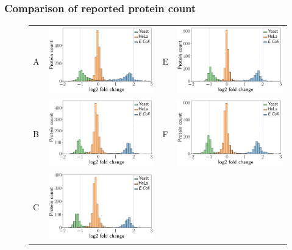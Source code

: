 \documentclass[11pt]{article}
\begin{document}
\subsubsection*{Comparison of reported protein count}
\begin{figure}[hbt]
    \centering
    \begin{tabular}{lclc} 
        A & \includegraphics[width=0.4\linewidth]{../../result/report_plots_pipeline/histogram_ID_triqler.png} & 
        E & \includegraphics[width=0.4\linewidth]{../../result/report_plots_pipeline/histogram_PS_triqler.png} \\ 
        B & \includegraphics[width=0.4\linewidth]{../../result/report_plots_pipeline/histogram_ID_msqrob2.png} & 
        F & \includegraphics[width=0.4\linewidth]{../../result/report_plots_pipeline/histogram_PS_msqrob2.png} \\ 
        C & \includegraphics[width=0.4\linewidth]{../../result/report_plots_pipeline/histogram_ID_msstats.png} & 

\end{tabular}
\end{figure}
\end{document}
